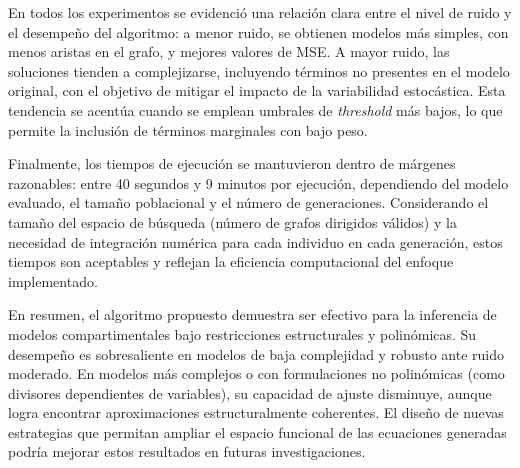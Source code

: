 En todos los experimentos se evidenció una relación clara entre el nivel de ruido y el desempeño del algoritmo: a menor ruido, se obtienen modelos más simples, con menos aristas en el grafo, y mejores valores de MSE. A mayor ruido, las soluciones tienden a complejizarse, incluyendo términos no presentes en el modelo original, con el objetivo de mitigar el impacto de la variabilidad estocástica. Esta tendencia se acentúa cuando se emplean umbrales de \textit{threshold} más bajos, lo que permite la inclusión de términos marginales con bajo peso.

Finalmente, los tiempos de ejecución se mantuvieron dentro de márgenes razonables: entre 40 segundos y 9 minutos por ejecución, dependiendo del modelo evaluado, el tamaño poblacional y el número de generaciones. Considerando el tamaño del espacio de búsqueda (número de grafos dirigidos válidos) y la necesidad de integración numérica para cada individuo en cada generación, estos tiempos son aceptables y reflejan la eficiencia computacional del enfoque implementado.

En resumen, el algoritmo propuesto demuestra ser efectivo para la inferencia de modelos compartimentales bajo restricciones estructurales y polinómicas. Su desempeño es sobresaliente en modelos de baja complejidad y robusto ante ruido moderado. En modelos más complejos o con formulaciones no polinómicas (como divisores dependientes de variables), su capacidad de ajuste disminuye, aunque logra encontrar aproximaciones estructuralmente coherentes. El diseño de nuevas estrategias que permitan ampliar el espacio funcional de las ecuaciones generadas podría mejorar estos resultados en futuras investigaciones.


